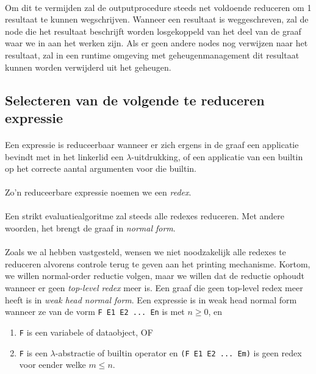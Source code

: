 \documentclass[a4paper,10pt]{article}
\begin{document}
\paragraph{}
Om dit te vermijden zal de outputprocedure steeds net voldoende reduceren om 1 resultaat te kunnen wegschrijven.
Wanneer een resultaat is weggeschreven, zal de node die het resultaat beschrijft worden losgekoppeld van het deel van de graaf waar we in aan het werken zijn.
Als er geen andere nodes nog verwijzen naar het resultaat, zal in een runtime omgeving met geheugenmanagement dit resultaat kunnen worden verwijderd uit het geheugen.


\subsection{Selecteren van de volgende te reduceren expressie}
\paragraph{}
Een expressie is reduceerbaar wanneer er zich ergens in de graaf een applicatie bevindt met in het linkerlid een $\lambda$-uitdrukking, of een applicatie van een builtin op het correcte aantal argumenten voor die builtin.
\paragraph{}
Zo'n reduceerbare expressie noemen we een \emph{redex}.
\paragraph{}
Een strikt evaluatiealgoritme zal steeds alle redexes reduceren.
Met andere woorden, het brengt de graaf in \emph{normal form}.
\paragraph{}
Zoals we al hebben vastgesteld, wensen we niet noodzakelijk alle redexes te reduceren alvorens controle terug te geven aan het printing mechanisme.
Kortom, we willen normal-order reductie volgen, maar we willen dat de reductie ophoudt wanneer er geen \emph{top-level redex} meer is.
Een graaf die geen top-level redex meer heeft is in \emph{weak head normal form}.
Een expressie is in weak head normal form wanneer ze van de vorm \texttt{F E1 E2 ... En} is met $n \geq 0$, en
\begin{enumerate}
\item \texttt{F} is een variabele of dataobject, OF
\item \texttt{F} is een $\lambda$-abstractie of builtin operator en \texttt{(F E1 E2 ... Em)} is geen redex voor eender welke $m \leq n$.
\end{enumerate}
\end{document}
